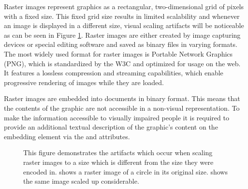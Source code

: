 Raster images represent graphics as a rectangular, two-dimensional grid of pixels with a fixed size. 
This fixed grid size results in limited scalability and whenever an image is displayed in a different size, visual scaling artifacts will be noticeable as can be seen in Figure \ref{fig:RasterImage}. 
Raster images are either created by image capturing devices or special editing software and saved as binary files in varying formats. 
The most widely used format for raster images is Portable Network Graphics (PNG), which is standardized by the W3C \parencite{PNG} and optimized for usage on the web. 
It features a lossless compression and streaming capabilities, which enable progressive rendering of images while they are loaded.

Raster images are embedded into documents in binary format. 
This means that the contents of the graphic are not accessible in a non-visual representation. 
To make the information accessible to visually impaired people it is required to provide an additional textual description of the graphic's content on the embedding element via the  and  attributes.

\begin{figure}[tp]
\centering
{}
\caption[Raster Image Scaling]{
  This figure demonstrates the artifacts which occur when scaling raster images to a size which is different from the size they were encoded in.
   shows a raster image of a circle in its original size.
   shows the same image scaled up considerable. 
}
\label{fig:RasterImage}
\end{figure}

